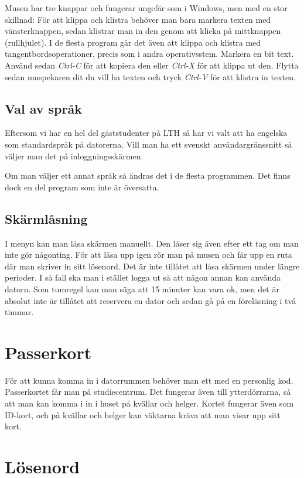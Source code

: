 \documentclass[a4paper,twocolumn]{book}
\begin{document}
Musen har tre knappar och fungerar ungefär som i Windows, men med en stor
skillnad: För att klippa och klistra behöver man bara markera texten med
vänsterknappen, sedan klistrar man in den genom att klicka på mittknappen
(rullhjulet). I de flesta program går det även att klippa och klistra med
tangentbordsoperationer, precis som i andra operativsstem.
Markera en bit text. Använd sedan \emph{Ctrl-C} för
att kopiera den eller \emph{Ctrl-X} för att klippa ut den. Flytta sedan
muspekaren dit du vill ha texten och tryck \emph{Ctrl-V} för att klistra in
texten.
\subsection{Val av språk}
Eftersom vi har en hel del gäststudenter på LTH så har vi valt att ha engelska
som standardspråk på datorerna. Vill man ha ett svenskt användargränssnitt så
väljer man det på inloggningsskärmen.

Om man väljer ett annat språk så ändras det i de flesta programmen. Det finns
dock en del program som inte är översatta.

\subsection{Skärmlåsning}

I menyn kan man låsa skärmen manuellt. Den låser sig även efter
ett tag om man inte gör någonting. För att låsa upp igen rör man på musen och
får upp en ruta där man skriver in sitt lösenord. Det är inte tillåtet att
låsa skärmen under längre perioder. I så fall ska man i stället logga ut så
att någon annan kan använda datorn. Som tumregel kan man säga att 15
minuter kan vara ok, men det är absolut inte är tillåtet att reservera en
dator och sedan gå på en föreläsning i två timmar.

\section{Passerkort}

För att kunna komma in i datorrummen behöver man ett
 med en personlig kod. Passerkortet får man på studiecentrum.
Det fungerar även till ytterdörrarna, så att man kan komma i in i huset på
kvällar och helger. Kortet fungerar även som ID-kort, och på kvällar och
helger kan väktarna kräva att man visar upp sitt kort.

\section{Lösenord}
\end{document}
